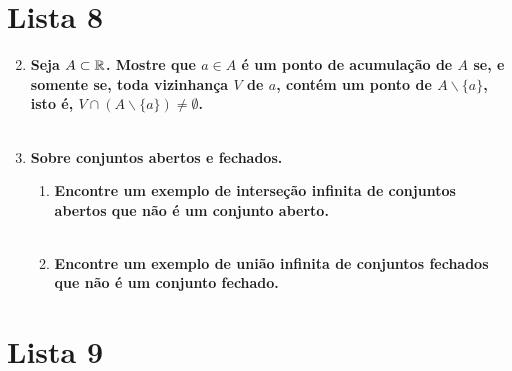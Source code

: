 \documentclass[%
  a4paper,%
  12pt,%
  fleqn,%
  english,%
  brazilian,%
]{article}
\begin{document}
\section*{Lista 8}
\begin{enumerate}[wide, labelwidth=!, labelindent=0pt]
  \setcounter{enumi}{1}
	\item \textbf{Seja $A\subset \mathbb R$. Mostre que $a \in A$ é um ponto de acumulação de $A$ se, e somente se, toda vizinhança $V$ de $a$, contém um ponto de $A\backslash \{a\}$, isto é, $V \cap (A \backslash \{a\}) \neq \emptyset$.}\\
	\\
  \setcounter{enumi}{4}
	\vspace{3mm}
	\item \textbf{Sobre conjuntos abertos e fechados.}
	\begin{enumerate}[label=\alph*)]
		\item \textbf{Encontre um exemplo de interseção infinita de conjuntos abertos que não é um conjunto aberto.}
		\\
		\\
		\item \textbf{Encontre um exemplo de união infinita de conjuntos fechados que não é um conjunto fechado.}\\
	\end{enumerate}
\end{enumerate}

\section*{Lista 9}
\end{document}
